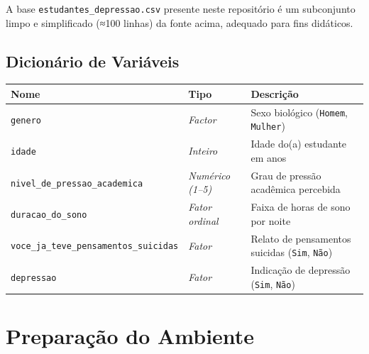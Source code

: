 \documentclass[
]{article}
\begin{document}
A base \texttt{estudantes\_depressao.csv} presente neste repositório é
um subconjunto limpo e simplificado (≈100 linhas) da fonte acima,
adequado para fins didáticos.

\subsection{Dicionário de
Variáveis}\label{dicionuxe1rio-de-variuxe1veis}

\begin{longtable}[]{@{}
  >{\raggedright\arraybackslash}p{}
  >{\raggedright\arraybackslash}p{}
  >{\raggedright\arraybackslash}p{}@{}}
\toprule\noalign{}
\begin{minipage}[b]{\linewidth}\raggedright
Nome
\end{minipage} & \begin{minipage}[b]{\linewidth}\raggedright
Tipo
\end{minipage} & \begin{minipage}[b]{\linewidth}\raggedright
Descrição
\end{minipage} \\
\midrule\noalign{}
\endhead
\bottomrule\noalign{}
\endlastfoot
\texttt{genero} & \emph{Factor} & Sexo biológico (\texttt{Homem},
\texttt{Mulher}) \\
\texttt{idade} & \emph{Inteiro} & Idade do(a) estudante em anos \\
\texttt{nivel\_de\_pressao\_academica} & \emph{Numérico (1--5)} & Grau
de pressão acadêmica percebida \\
\texttt{duracao\_do\_sono} & \emph{Fator ordinal} & Faixa de horas de
sono por noite \\
\texttt{voce\_ja\_teve\_pensamentos\_suicidas} & \emph{Fator} & Relato
de pensamentos suicidas (\texttt{Sim}, \texttt{Não}) \\
\texttt{depressao} & \emph{Fator} & Indicação de depressão
(\texttt{Sim}, \texttt{Não}) \\
\end{longtable}

\section{Preparação do Ambiente}\label{ambiente}
\end{document}
